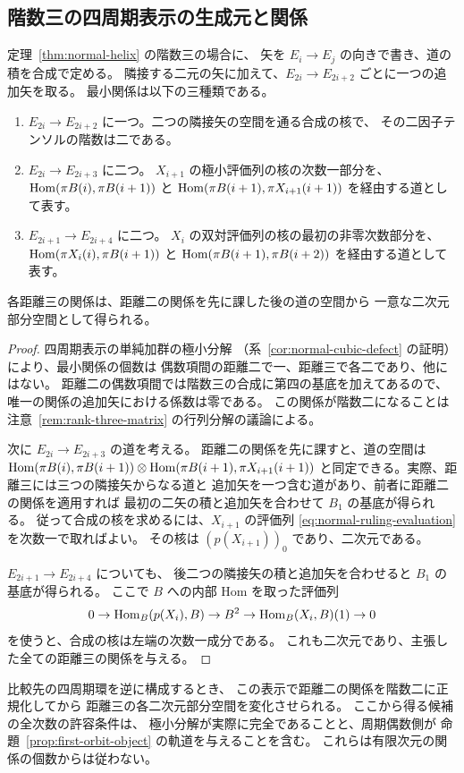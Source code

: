 \subsection{階数三の四周期表示の生成元と関係}
\label{subsec:rank-three-relations}

\begin{proposition}
\label{prop:rank-three-relations}
定理~\ref{thm:normal-helix} の階数三の場合に、
矢を $E_i\to E_j$ の向きで書き、道の積を合成で定める。
隣接する二元の矢に加えて、$E_{2i}\to E_{2i+2}$ ごとに一つの追加矢を取る。
最小関係は以下の三種類である。
\begin{enumerate}
\item $E_{2i}\to E_{2i+2}$ に一つ。二つの隣接矢の空間を通る合成の核で、
その二因子テンソルの階数は二である。
\item $E_{2i}\to E_{2i+3}$ に二つ。
$X_{i+1}$ の極小評価列の核の次数一部分を、
$\operatorname{Hom}(\pi B(i),\pi B(i+1))$ と $\operatorname{Hom}(\pi B(i+1),\pi X_{i+1}(i+1))$
を経由する道として表す。
\item $E_{2i+1}\to E_{2i+4}$ に二つ。
$X_i$ の双対評価列の核の最初の非零次数部分を、
$\operatorname{Hom}(\pi X_i(i),\pi B(i+1))$ と $\operatorname{Hom}(\pi B(i+1),\pi B(i+2))$
を経由する道として表す。
\end{enumerate}
各距離三の関係は、距離二の関係を先に課した後の道の空間から
一意な二次元部分空間として得られる。
\end{proposition}

\begin{proof}
四周期表示の単純加群の極小分解
（系~\ref{cor:normal-cubic-defect} の証明）により、最小関係の個数は
偶数項間の距離二で一、距離三で各二であり、他にはない。
距離二の偶数項間では階数三の合成に第四の基底を加えてあるので、
唯一の関係の追加矢における係数は零である。
この関係が階数二になることは
注意~\ref{rem:rank-three-matrix} の行列分解の議論による。

次に $E_{2i}\to E_{2i+3}$ の道を考える。
距離二の関係を先に課すと、道の空間は
$\operatorname{Hom}(\pi B(i),\pi B(i+1))\otimes\operatorname{Hom}(\pi B(i+1),\pi X_{i+1}(i+1))$
と同定できる。実際、距離三には三つの隣接矢からなる道と
追加矢を一つ含む道があり、前者に距離二の関係を適用すれば
最初の二矢の積と追加矢を合わせて $B_1$ の基底が得られる。
従って合成の核を求めるには、$X_{i+1}$ の評価列
\eqref{eq:normal-ruling-evaluation} を次数一で取ればよい。
その核は $(p(X_{i+1}))_0$ であり、二次元である。

$E_{2i+1}\to E_{2i+4}$ についても、
後二つの隣接矢の積と追加矢を合わせると $B_1$ の基底が得られる。
ここで $B$ への内部 Hom を取った評価列
\[
 0\to\operatorname{Hom}_B(p(X_i),B)\to B^2
       \to \operatorname{Hom}_B(X_i,B)(1)\to0
\]
を使うと、合成の核は左端の次数一成分である。
これも二次元であり、主張した全ての距離三の関係を与える。
\end{proof}

比較先の四周期環を逆に構成するとき、
この表示で距離二の関係を階数二に正規化してから
距離三の各二次元部分空間を変化させられる。
ここから得る候補の全次数の許容条件は、
極小分解が実際に完全であることと、周期偶数側が
命題~\ref{prop:first-orbit-object} の軌道を与えることを含む。
これらは有限次元の関係の個数からは従わない。
